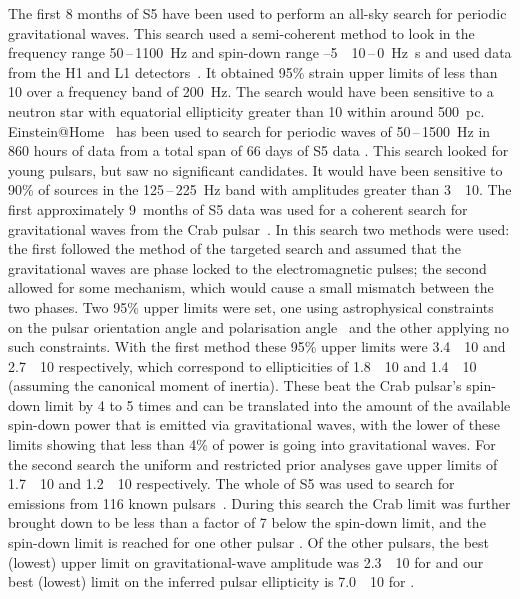 The first 8 months of S5 have been used to perform an all-sky search for
periodic gravitational waves. This search used a semi-coherent method to look
in the frequency range 50\,--\,1100~Hz and spin-down range
--5~\texttimes~10\,--\,0~Hz~s and used data from
the H1 and L1 detectors~\cite{Abbott:2008i}. It obtained 95\% strain
upper limits of less than 10 over a frequency band of
200~Hz. The search would have been sensitive to a neutron star with
equatorial ellipticity greater than 10 within around
500~pc. Einstein@Home~\cite{eath} has been used to search for periodic
waves of 50\,--\,1500~Hz in 860 hours of data from a total span
of 66 days of S5 data \cite{Abbott:2009a}. This search looked for
young pulsars, but saw no significant candidates. It would have been
sensitive to 90\% of sources in the 125\,--\,225~Hz band with
amplitudes greater than 3~\texttimes~10. The first
approximately 9~months of S5 data was used for a coherent search for
gravitational waves from the Crab pulsar~\cite{Abbott:2008j}. In this
search two methods were used: the first followed the method of the targeted
search and assumed that the gravitational waves are phase locked to
the electromagnetic pulses; the second allowed for some mechanism,
which would cause a small mismatch between the two phases. Two 95\%
upper limits were set, one using astrophysical
constraints on the pulsar orientation angle and polarisation angle~\cite{Ng:2008}
and the other applying no such constraints. With the first method these 95\%
upper limits were 3.4~\texttimes~10 and 2.7~\texttimes~10 respectively,
which correspond to ellipticities of 1.8~\texttimes~10 and 1.4~\texttimes~10
(assuming the canonical moment of inertia). These beat the Crab pulsar's
spin-down limit by 4 to 5 times and can be translated into the amount of the
available spin-down power that is emitted via gravitational waves, with the
lower of these limits showing that less than 4\% of power is going into
gravitational waves. For the second search the uniform and restricted prior analyses gave
upper limits of 1.7~\texttimes~10 and 1.2~\texttimes~10
respectively. The whole of S5 was used to search for emissions from 116 known
pulsars~\cite{Abbott:2010a}. During this search the Crab limit was further
brought down to be less than a factor of 7 below the spin-down limit, and the
spin-down limit is reached for one other pulsar . Of the other
pulsars, the best (lowest) upper limit on gravitational-wave amplitude was
2.3~\texttimes~10 for  and our best (lowest) limit on the
inferred pulsar ellipticity is 7.0~\texttimes~10 for .


